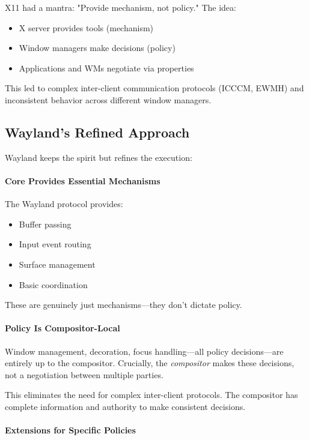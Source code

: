X11 had a mantra: "Provide mechanism, not policy." The idea:
\begin{itemize}
    \item X server provides tools (mechanism)
    \item Window managers make decisions (policy)
    \item Applications and WMs negotiate via properties
\end{itemize}

This led to complex inter-client communication protocols (ICCCM, EWMH) and inconsistent behavior across different window managers.

\subsection{Wayland's Refined Approach}

Wayland keeps the spirit but refines the execution:

\paragraph{Core Provides Essential Mechanisms}
The Wayland protocol provides:
\begin{itemize}
    \item Buffer passing
    \item Input event routing
    \item Surface management
    \item Basic coordination
\end{itemize}

These are genuinely just mechanisms—they don't dictate policy.

\paragraph{Policy Is Compositor-Local}

Window management, decoration, focus handling—all policy decisions—are entirely up to the compositor. Crucially, the \textit{compositor} makes these decisions, not a negotiation between multiple parties.

This eliminates the need for complex inter-client protocols. The compositor has complete information and authority to make consistent decisions.

\paragraph{Extensions for Specific Policies}

